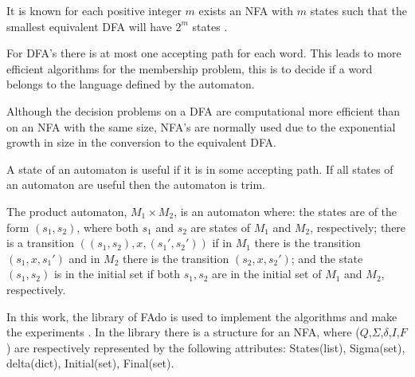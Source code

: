 It is known for each positive integer $m$ exists an NFA with $m$ states such that the smallest equivalent DFA will have $2^m$ states \cite{Leung05}.

For DFA's there is at most one accepting path for each word. This leads to more efficient algorithms for the membership problem, this is to decide if a word belongs to the language defined by the automaton.

Although the decision problems on a DFA are computational more efficient than on an NFA with the same size, NFA's are normally used due to the exponential growth in size in the conversion to the equivalent DFA.

\begin{definition}
A state of an automaton is useful if it is in some accepting path. If all states of an automaton are useful then the automaton is trim.
\end{definition}

\begin{definition}
The product automaton, $M_1 \times M_2$, is an automaton where: the states are of the form $(s_1,s_2)$, where both $s_1$ and $s_2$ are states of $M_1$ and $M_2$, respectively; there is a transition $((s_1,s_2),x,(s_1',s_2'))$ if in $M_1$ there is the transition $(s_1,x,s_1')$ and in $M_2$ there is the transition $(s_2,x,s_2')$; and the state $(s_1,s_2)$ is in the initial set if both $s_1,s_2$ are in the initial set of $M_1$ and $M_2$, respectively.
\end{definition}

In this work, the library of FAdo is used to implement the algorithms and make the experiments \cite{BRODA201994}.
In the library there is a structure for an NFA, where ($Q$,$\Sigma$,$\delta$,$I$,$F$) are respectively represented by the following attributes: States(list), Sigma(set), delta(dict), Initial(set), Final(set).
